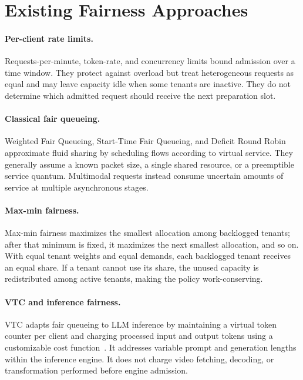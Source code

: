 \documentclass[sigplan,anonymous,review,nonacm]{acmart}
\begin{document}
\section{Existing Fairness Approaches}

\paragraph{Per-client rate limits.}
Requests-per-minute, token-rate, and concurrency limits bound admission over a
time window. They protect against overload but treat heterogeneous requests as
equal and may leave capacity idle when some tenants are inactive. They do not
determine which admitted request should receive the next preparation slot.

\paragraph{Classical fair queueing.}
Weighted Fair Queueing, Start-Time Fair Queueing, and Deficit Round Robin
approximate fluid sharing by scheduling flows according to virtual service.
They generally assume a known packet size, a single shared resource, or a
preemptible service quantum. Multimodal requests instead consume uncertain
amounts of service at multiple asynchronous stages.

\paragraph{Max-min fairness.}
Max-min fairness maximizes the smallest allocation among backlogged tenants;
after that minimum is fixed, it maximizes the next smallest allocation, and so
on. With equal tenant weights and equal demands, each backlogged tenant
receives an equal share. If a tenant cannot use its share, the unused capacity
is redistributed among active tenants, making the policy work-conserving.

\paragraph{VTC and inference fairness.}
VTC adapts fair queueing to LLM inference by maintaining a virtual token
counter per client and charging processed input and output tokens using a
customizable cost function~\cite{sheng2024vtc}. It addresses variable prompt and generation
lengths within the inference engine. It does not charge video fetching,
decoding, or transformation performed before engine admission.
\end{document}
